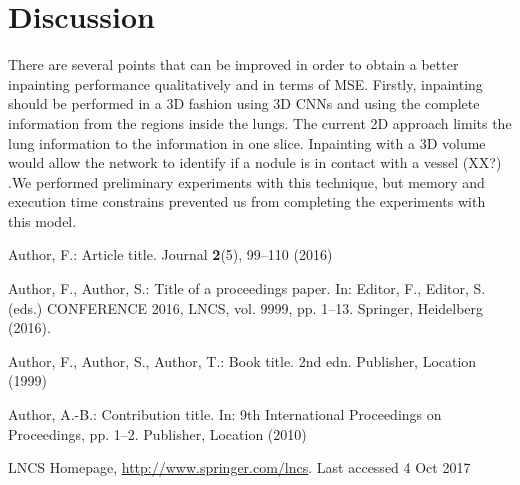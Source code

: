\documentclass[runningheads]{llncs}
\begin{document}
\section{Discussion}
There are several points that can be improved in order to obtain a better inpainting performance qualitatively and in terms of MSE. Firstly, inpainting should be performed in a 3D fashion using 3D CNNs and using the complete information from the regions inside the lungs. The current 2D approach limits the lung information to the information in one slice. Inpainting with a 3D volume would allow the network to identify if a nodule is in contact with a vessel (XX?) .We performed preliminary experiments with this technique, but memory and execution time constrains prevented us from completing the experiments with this model.

%
%
%
% 
% 
%
\begin{thebibliography}{bibliography}
Author, F.: Article title. Journal \textbf{2}(5), 99--110 (2016)

Author, F., Author, S.: Title of a proceedings paper. In: Editor,
F., Editor, S. (eds.) CONFERENCE 2016, LNCS, vol. 9999, pp. 1--13.
Springer, Heidelberg (2016). 

Author, F., Author, S., Author, T.: Book title. 2nd edn. Publisher,
Location (1999)

Author, A.-B.: Contribution title. In: 9th International Proceedings
on Proceedings, pp. 1--2. Publisher, Location (2010)

LNCS Homepage, \url{http://www.springer.com/lncs}. Last accessed 4
Oct 2017
\end{thebibliography}
\end{document}
